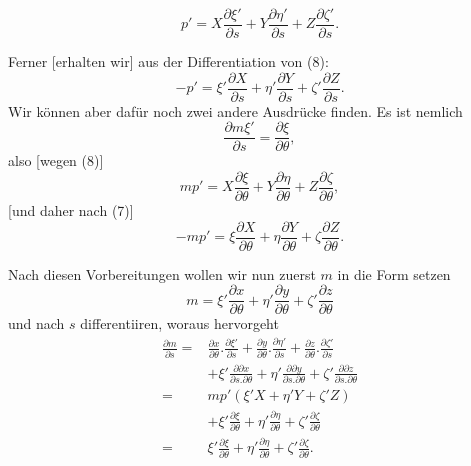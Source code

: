 %
\[
p'=X\frac{\partial\xi'}{\partial s}+Y\frac{\partial\eta'}{\partial s}+Z\frac{\partial\zeta'}{\partial s}.
\]

Ferner [erhalten wir] aus der Differentiation von (8):
\[
-p'=\xi'\frac{\partial X}{\partial s}+\eta'\frac{\partial Y}{\partial s}+\zeta'\frac{\partial Z}{\partial s}.
\]
Wir können aber dafür noch zwei andere Ausdrücke finden. Es ist nemlich
\[
\frac{\partial m\xi'}{\partial s}=\frac{\partial\xi}{\partial\theta},
\]
also [wegen (8)]
\[
mp'=X\frac{\partial\xi}{\partial\theta}+Y\frac{\partial\eta}{\partial\theta}+Z\frac{\partial\zeta}{\partial\theta},
\]
[und daher nach (7)]
\[
-mp'=\xi\frac{\partial X}{\partial\theta}+\eta\frac{\partial Y}{\partial\theta}+\zeta\frac{\partial Z}{\partial\theta}.
\]

Nach diesen Vorbereitungen wollen wir nun zuerst $m$ in die Form setzen
\[
m=\xi'\frac{\partial x}{\partial\theta}+\eta'\frac{\partial y}{\partial\theta}+\zeta'\frac{\partial z}{\partial\theta}
\]
und nach $s$ differentiiren, woraus hervorgeht
\[
\begin{aligned}
\frac{\partial m}{\partial s}={}&\frac{\partial x}{\partial\theta}.\frac{\partial\xi'}{\partial s}+\frac{\partial y}{\partial\theta}.\frac{\partial\eta'}{\partial s}+\frac{\partial z}{\partial\theta}.\frac{\partial\zeta'}{\partial s}\\
&+\xi'\frac{\partial\partial x}{\partial s.\partial\theta}+\eta'\frac{\partial\partial y}{\partial s.\partial\theta}+\zeta'\frac{\partial\partial z}{\partial s.\partial\theta}\\
={}&mp'(\xi'X+\eta'Y+\zeta'Z)\\
&+\xi'\frac{\partial\xi}{\partial\theta}+\eta'\frac{\partial\eta}{\partial\theta}+\zeta'\frac{\partial\zeta}{\partial\theta}\\
={}&\xi'\frac{\partial\xi}{\partial\theta}+\eta'\frac{\partial\eta}{\partial\theta}+\zeta'\frac{\partial\zeta}{\partial\theta}.
\end{aligned}
\]
